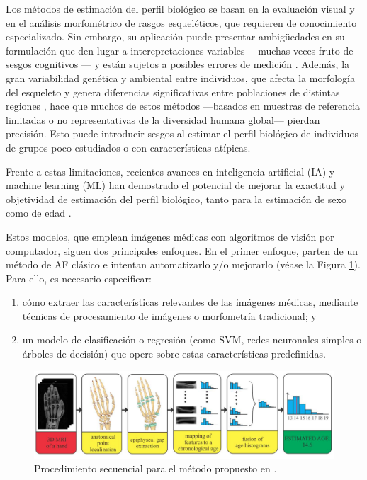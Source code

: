 Los métodos de estimación del perfil biológico se basan en la evaluación visual y en el análisis morfométrico de rasgos
esqueléticos, que requieren de conocimiento especializado. Sin embargo, su aplicación puede presentar ambigüedades en 
su formulación que den lugar a interepretaciones variables ---muchas veces fruto de sesgos cognitivos
\cite{nakhaeizadeh2014, cooper2019}--- y están sujetos a posibles errores de medición \cite{langley2018}.
Además, la gran variabilidad genética y ambiental entre individuos, que afecta la morfología del esqueleto y genera 
diferencias significativas entre poblaciones de distintas regiones \cite{ubelaker2017}, hace que muchos de estos métodos 
---basados en muestras de referencia limitadas o no representativas de la diversidad humana global--- pierdan precisión. 
Esto puede introducir sesgos al estimar el perfil biológico de individuos de grupos poco estudiados o con características 
atípicas.

Frente a estas limitaciones, recientes avances en inteligencia artificial (IA) y machine learning (ML) han demostrado 
el potencial de mejorar la exactitud y objetividad de estimación del perfil biológico, tanto para la estimación de sexo 
\cite{curate2017, darmawan2015, pinto2016} como de edad \cite{kim2017, larson2018, lee2017}. 

Estos modelos, que emplean imágenes médicas con algoritmos de visión por computador, siguen dos principales enfoques.
En el primer enfoque, parten de un método de AF clásico e intentan automatizarlo y/o mejorarlo 
\cite{stern2014, ajafernandez2004} (véase la Figura \ref{fig:MRI_pipeline}). 
Para ello, es necesario especificar:

\begin{enumerate}
    \item cómo extraer las características relevantes de las imágenes médicas, mediante técnicas de procesamiento de 
    imágenes o morfometría tradicional; y
    \item un modelo de clasificación o regresión (como SVM, redes neuronales simples o árboles de decisión) que opere 
    sobre estas características predefinidas.
\end{enumerate}

\begin{figure}[h]
    \centering
    \includegraphics[width=\textwidth]{capitulos/cap_01/imagenes/MRI_pipeline.png}
    \caption{Procedimiento secuencial para el método propuesto en \cite{stern2014}.} 
    \label{fig:MRI_pipeline}
\end{figure}


